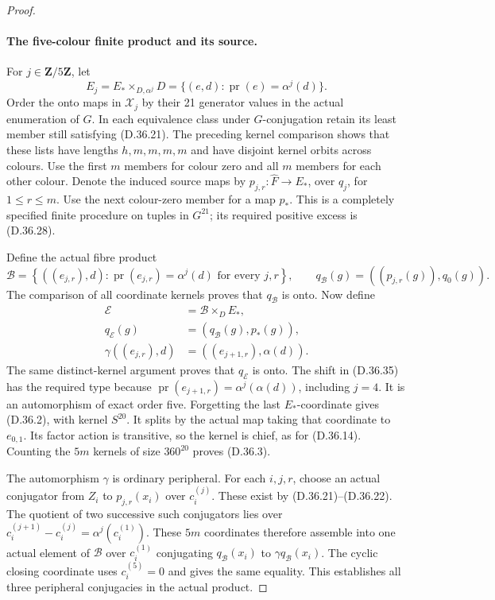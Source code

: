 \begin{proof}
\paragraph{The five-colour finite product and its source.}
For \(j\in\mathbf Z/5\mathbf Z\), let
\[
 E_j=E_*\times_{D,\alpha^j}D
       =\{(e,d):\operatorname{pr}(e)=\alpha^j(d)\}.
 \tag{D.36.33}
\]
Order the onto maps in \(\mathscr X_j\) by their
21 generator values in the actual enumeration of \(G\).
In each equivalence class under \(G\)-conjugation
retain its least member still satisfying
\textup{(D.36.21)}.  The preceding kernel comparison
shows that these lists have lengths \(h,m,m,m,m\)
and have disjoint kernel orbits across colours.
Use the first \(m\) members for colour zero and
all \(m\) members for each other colour.
Denote the induced source maps by
\(p_{j,r}:\widehat F\to E_*\), over \(q_j\),
for \(1\leq r\leq m\).
Use the next colour-zero member for a map \(p_*\).
This is a completely specified finite procedure
on tuples in \(G^{21}\); its required positive
excess is \textup{(D.36.28)}.

Define the actual fibre product
\[
 \mathcal B
  =\left\{((e_{j,r}),d):
       \operatorname{pr}(e_{j,r})=\alpha^j(d)
       \text{ for every }j,r\right\},
 \qquad
 q_{\mathcal B}(g)=((p_{j,r}(g)),q_0(g)).
 \tag{D.36.34}
\]
The comparison of all coordinate kernels proves
that \(q_{\mathcal B}\) is onto.
Now define
\[
 \begin{split}
 \mathcal E&=\mathcal B\times_D E_*,\\
 q_{\mathcal E}(g)&=(q_{\mathcal B}(g),p_*(g)),\\
 \gamma((e_{j,r}),d)&=((e_{j+1,r}),\alpha(d)).
 \end{split}
 \tag{D.36.35}
\]
The same distinct-kernel argument proves that
\(q_{\mathcal E}\) is onto.  The shift in
\textup{(D.36.35)} has the required type because
\(\operatorname{pr}(e_{j+1,r})=\alpha^j(\alpha(d))\),
including \(j=4\).  It is an automorphism of
exact order five.
Forgetting the last \(E_*\)-coordinate gives
\textup{(D.36.2)}, with kernel \(S^{20}\).
It splits by the actual map taking that coordinate
to \(e_{0,1}\).  Its factor action is transitive,
so the kernel is chief, as for \textup{(D.36.14)}.
Counting the \(5m\) kernels of size \(360^{20}\)
proves \textup{(D.36.3)}.

The automorphism \(\gamma\) is ordinary peripheral.
For each \(i,j,r\), choose an actual conjugator
from \(Z_i\) to \(p_{j,r}(x_i)\) over \(c_i^{(j)}\).
These exist by \textup{(D.36.21)--(D.36.22)}.
The quotient of two successive such conjugators
lies over
\(c_i^{(j+1)}-c_i^{(j)}=\alpha^j(c_i^{(1)})\).
These \(5m\) coordinates therefore assemble into
one actual element of \(\mathcal B\) over
\(c_i^{(1)}\) conjugating \(q_{\mathcal B}(x_i)\)
to \(\gamma q_{\mathcal B}(x_i)\).
The cyclic closing coordinate uses \(c_i^{(5)}=0\)
and gives the same equality.  This establishes all
three peripheral conjugacies in the actual product.


\end{proof}
